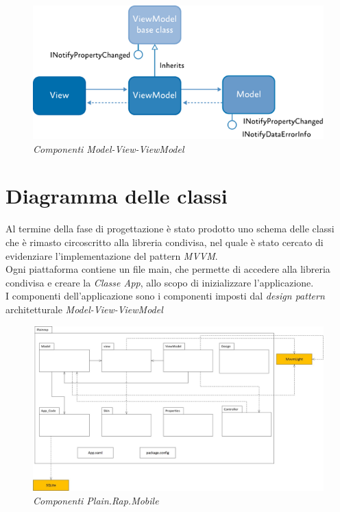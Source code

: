 		\begin{figure}[ht]
			\centering
			\includegraphics[scale=0.35]{immagini/progettazione/IC448599.png}
			\caption{\textit{Componenti Model-View-ViewModel}}
		\end{figure}\FloatBarrier

\section{Diagramma delle classi}
Al termine della fase di progettazione è stato prodotto uno schema delle classi che è rimasto circoscritto alla libreria condivisa, nel quale è stato cercato di evidenziare l'implementazione del pattern \textit{MVVM}.
\\
Ogni piattaforma contiene un file main, che permette di accedere alla libreria condivisa e creare la \textit{Classe App}, allo scopo di inizializzare l'applicazione.
\\
I componenti dell'applicazione \app sono i componenti imposti dal \textit{design pattern} architetturale \textit{Model-View-ViewModel}
		\begin{figure}[ht]
			\centering
			\includegraphics[scale=0.35]{immagini/progettazione/plainrap_portable.jpg}
			\caption{\textit{Componenti Plain.Rap.Mobile}}
		\end{figure}\FloatBarrier

